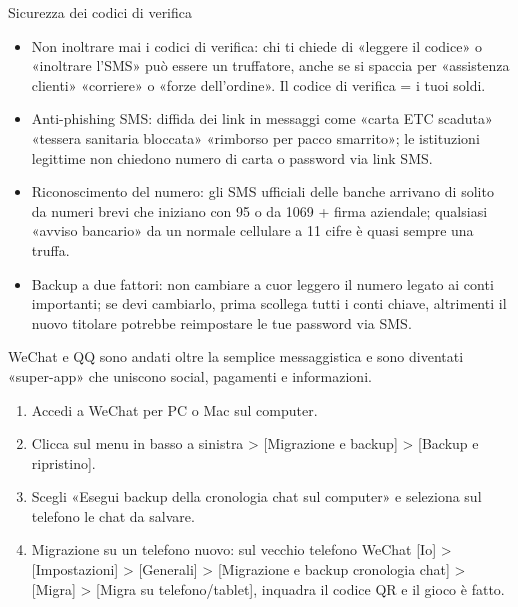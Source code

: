 \begin{tcbwarn}{Sicurezza dei codici di verifica}
\begin{itemize}
  \item Non inoltrare mai i codici di verifica: chi ti chiede di «leggere il codice» o «inoltrare l'SMS» può essere un truffatore, anche se si spaccia per «assistenza clienti» «corriere» o «forze dell'ordine». Il codice di verifica = i tuoi soldi.
  \item Anti-phishing SMS: diffida dei link in messaggi come «carta ETC scaduta» «tessera sanitaria bloccata» «rimborso per pacco smarrito»; le istituzioni legittime non chiedono numero di carta o password via link SMS.
  \item Riconoscimento del numero: gli SMS ufficiali delle banche arrivano di solito da numeri brevi che iniziano con 95 o da 1069 + firma aziendale; qualsiasi «avviso bancario» da un normale cellulare a 11 cifre è quasi sempre una truffa.
  \item Backup a due fattori: non cambiare a cuor leggero il numero legato ai conti importanti; se devi cambiarlo, prima scollega tutti i conti chiave, altrimenti il nuovo titolare potrebbe reimpostare le tue password via SMS.
\end{itemize}

\end{tcbwarn}


WeChat e QQ sono andati oltre la semplice messaggistica e sono diventati «super-app» che uniscono social, pagamenti e informazioni.


\begin{enumerate}
  \item Accedi a WeChat per PC o Mac sul computer.
  \item Clicca sul menu in basso a sinistra > [Migrazione e backup] > [Backup e ripristino].
  \item Scegli «Esegui backup della cronologia chat sul computer» e seleziona sul telefono le chat da salvare.
  \item Migrazione su un telefono nuovo: sul vecchio telefono WeChat [Io] > [Impostazioni] > [Generali] > [Migrazione e backup cronologia chat] > [Migra] > [Migra su telefono/tablet], inquadra il codice QR e il gioco è fatto.
\end{enumerate}


